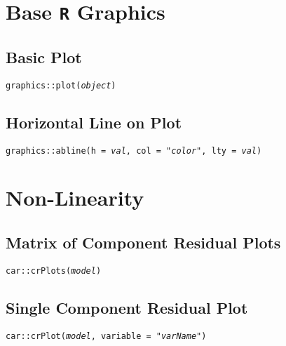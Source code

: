 \documentclass{tufte-handout}
\newenvironment{subs}
  {\adjustwidth{3em}{0pt}}
  {\endadjustwidth}
\begin{document}
\vspace{5mm}
\section{Base \texttt{R} Graphics}
\begin{subs}
\subsection{Basic Plot}
\noindent \texttt{graphics::}{\color{red}\texttt{plot}}\texttt{(\textit{object})}

\vspace{3mm}
\subsection{Horizontal Line on Plot}
\noindent \texttt{graphics::}{\color{red}\texttt{abline}}\texttt{(h = \textit{val}, col = "\textit{color}", lty = \textit{val})}
\end{subs}

\vspace{5mm}
\section{Non-Linearity}
\begin{subs}
\subsection{Matrix of Component Residual Plots}
\noindent \texttt{car::}{\color{red}\texttt{crPlots}}\texttt{(\textit{model})}

\vspace{3mm}
\subsection{Single Component Residual Plot}
\noindent \texttt{car::}{\color{red}\texttt{crPlot}}\texttt{(\textit{model}, variable = "\textit{varName}")}
\end{subs}

\vspace{5mm}
\end{document}

